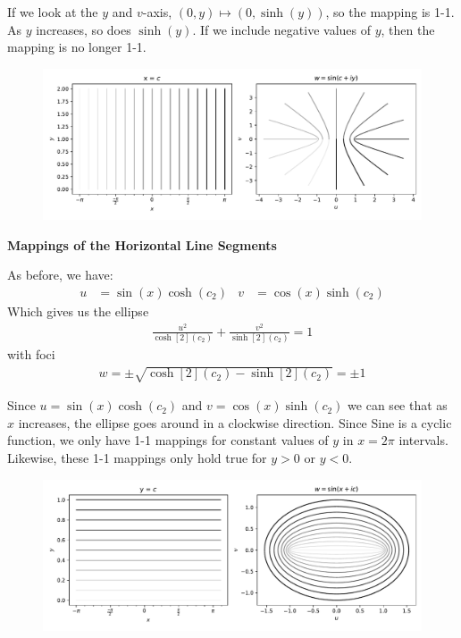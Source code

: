 \documentclass[12pt, english]{book}
\begin{document}
	If we look at the \(y\) and \(v\)-axis,  \((0, y) \mapsto (0, \sinh(y))\), so the mapping is 1-1. As \(y\) increases, so does \(\sinh(y)\). If we include negative values of \(y\), then the mapping is no longer 1-1.
	
	\begin{figure}[H]
		\centering
		\includegraphics[width=0.9\linewidth]{Python/Mapping_by_Sine_V}
		\label{fig:mappingbysinev}
		\caption*{}
	\end{figure}

	\textbf{Mappings of the Horizontal Line Segments}
	
	As before, we have:
	\begin{align*}
		u &= \sin(x) \cosh(c_2) & v &= \cos(x) \sinh(c_2)
	\end{align*}
	Which gives us the ellipse
	\begin{align*}
		\frac{u^2}{\cosh[2](c_2)} + \frac{v^2}{\sinh[2](c_2)} = 1
	\end{align*}
	with foci
	\begin{align*}
		w = \pm \sqrt{\cosh[2](c_2) - \sinh[2](c_2)} = \pm 1
	\end{align*}

	Since \(u = \sin(x) \cosh(c_2)\) and \(v = \cos(x) \sinh(c_2)\) we can see that as \(x\) increases, the ellipse goes around in a clockwise direction. Since Sine is a cyclic function, we only have 1-1 mappings for constant values of \(y\) in \(x=2\pi\) intervals. Likewise, these 1-1 mappings only hold true for \(y > 0\) or \(y < 0\).
	
	\begin{figure}[H]
		\centering
		\includegraphics[width=0.9\linewidth]{Python/Mapping_by_Sine_H}
		\caption*{}
		\label{fig:mappingbysineh}
	\end{figure}
\end{document}
